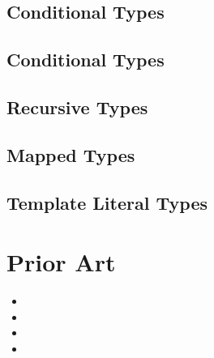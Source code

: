 \subsection{Conditional Types}
\subsection{Conditional Types}
\subsection{Recursive Types}
\subsection{Mapped Types}
\subsection{Template Literal Types}

\section{Prior Art}

\begin{itemize}
  \item {}
  \item {}
  \item {}
  \item {}
\end{itemize}